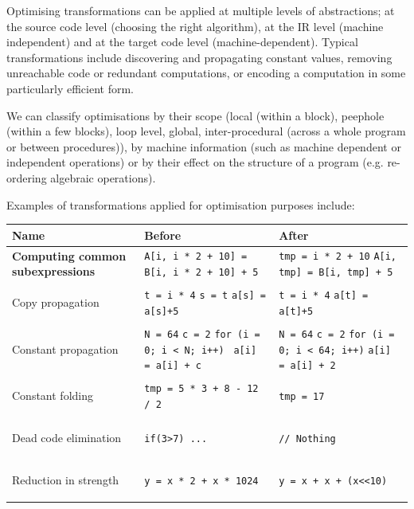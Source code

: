 Optimising transformations can be applied at multiple levels of
abstractions; at the source code level (choosing the right algorithm),
at the IR level (machine independent) and at the target code level
(machine-dependent). Typical transformations include discovering and
propagating constant values, removing unreachable code or redundant
computations, or encoding a computation in some particularly efficient
form.

We can classify optimisations by their scope (local (within a block),
peephole (within a few blocks), loop level, global, inter-procedural
(across a whole program or between procedures)), by machine
information (such as machine dependent or independent operations) or
by their effect on the structure of a program (e.g. re-ordering
algebraic operations).

Examples of transformations applied for optimisation purposes include:

\begin{tabular}{>{\bfseries}p{}p{}p{}}
Name & \textbf{Before} & \textbf{After}\\ \hline

  Computing common subexpressions &
  \texttt{A[i, i * 2 + 10] = B[i, i * 2 + 10] + 5} &
  \texttt{tmp = i * 2 + 10}\newline
  \texttt{A[i, tmp] = B[i, tmp] + 5}\\ \hline
  
  Copy propagation &
  \texttt{t = i * 4}\newline
  \texttt{s = t}\newline
  \texttt{a[s] = a[s]+5} &
  \texttt{t = i * 4}\newline
  \texttt{a[t] = a[t]+5}\\ \hline

  Constant propagation &
  \texttt{N = 64}\newline
  \texttt{c = 2}\newline
  \texttt{for (i = 0; i < N; i++) }\newline
  \texttt{a[i] = a[i] + c}\newline
  \texttt{}&
  \texttt{N = 64}\newline
  \texttt{c = 2}\newline
  \texttt{for (i = 0; i < 64; i++)}\newline
  \texttt{a[i] = a[i] + 2}\newline
  \texttt{}\\ \hline

  Constant folding &
  \texttt{tmp = 5 * 3 + 8 - 12 / 2} &
  \texttt{tmp = 17}\\ \hline

  Dead code elimination &
  \texttt{if(3>7) {...}} &
  \texttt{// Nothing}\\ \hline

  Reduction in strength &
  \texttt{y = x * 2 + x * 1024} &
  \texttt{y = x + x + (x<<10)}\\ \hline

\end{tabular}

